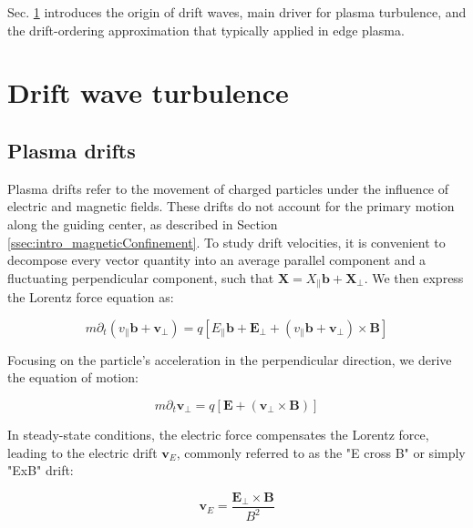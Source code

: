 Sec. \ref{sec:edge_driftWaves} introduces the origin of drift waves, main driver for plasma turbulence, and the drift-ordering approximation that typically applied in edge plasma. 

\section{Drift wave turbulence}
\label{sec:edge_driftWaves}




\subsection{Plasma drifts}
\label{ssec:edge_plasmaDrifts}

Plasma drifts refer to the movement of charged particles under the influence of electric and magnetic fields. These drifts do not account for the primary motion along the guiding center, as described in Section \ref{ssec:intro_magneticConfinement}. To study drift velocities, it is convenient to decompose every vector quantity into an average parallel component and a fluctuating perpendicular component, such that $\mathbf{X} = X_\parallel\mathbf{b} + \mathbf{X_\perp}$. We then express the Lorentz force equation as:

\begin{equation}
	\label{eq:edge_LorentzEquationDecomposition}
	m\partial_t\left(v_\parallel\mathbf{b} + \mathbf{v}_\perp\right) = q\left[E_\parallel\mathbf{b} + \mathbf{E}_\perp + \left(v_\parallel\mathbf{b} + \mathbf{v}_\perp\right) \times \mathbf{B}\right]
\end{equation}

Focusing on the particle's acceleration in the perpendicular direction, we derive the equation of motion:

\begin{equation}
	\label{eq:edge_EcrossBdrift}
	m\partial_t \mathbf{v}_\perp = q\left[\mathbf{E} + \left(\mathbf{v}_\perp \times \mathbf{B}\right)\right]
\end{equation}

In steady-state conditions, the electric force compensates the Lorentz force, leading to the electric drift $\mathbf{v}_E$, commonly referred to as the "E cross B" or simply "ExB" drift:

\begin{equation}
	\mathbf{v}_E = \frac{\mathbf{E}_\perp \times \mathbf{B}}{B^2}
\end{equation}

